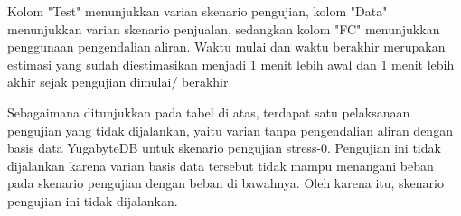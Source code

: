 Kolom "Test" menunjukkan varian skenario pengujian, kolom "Data" menunjukkan varian skenario penjualan, sedangkan kolom "FC" menunjukkan penggunaan pengendalian aliran. Waktu mulai dan waktu berakhir merupakan estimasi yang sudah diestimasikan menjadi 1 menit lebih awal dan 1 menit lebih akhir sejak pengujian dimulai/ berakhir.

Sebagaimana ditunjukkan pada tabel di atas, terdapat satu pelaksanaan pengujian yang tidak dijalankan, yaitu varian tanpa pengendalian aliran dengan basis data YugabyteDB untuk skenario pengujian stress-0. Pengujian ini tidak dijalankan karena varian basis data tersebut tidak mampu menangani beban pada skenario pengujian dengan beban di bawahnya. Oleh karena itu, skenario pengujian ini tidak dijalankan.

